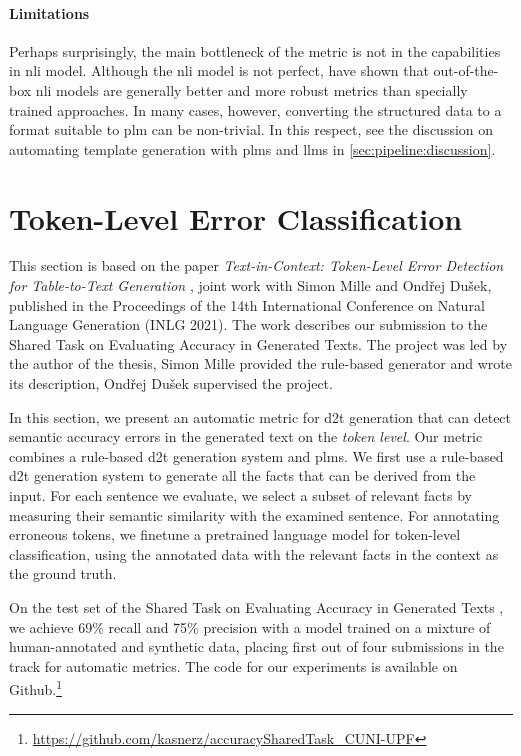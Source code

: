 \paragraph{Limitations} Perhaps surprisingly, the main bottleneck of the metric is not in the capabilities in \ac{nli} model. Although the \ac{nli} model is not perfect, \citet{chenMENLIRobustEvaluation2022} have shown that out-of-the-box \ac{nli} models are generally better and more robust metrics than specially trained approaches. In many cases, however, converting the structured data to a format suitable to \ac{plm} can be non-trivial. In this respect, see the discussion on automating template generation with \acp{plm} and \acp{llm} in \autoref{sec:pipeline:discussion}.


\section{Token-Level Error Classification}
\label{sec:tok-eval}

\begin{refbox}
    This section is based on the paper \emph{Text-in-Context: Token-Level Error Detection for Table-to-Text Generation} \cite{kasnerTextinContextTokenLevelError2021}, joint work with Simon Mille and Ondřej Dušek, published in the Proceedings of the 14th International Conference on Natural Language Generation (INLG 2021). The work describes our submission to the Shared Task on Evaluating Accuracy in Generated Texts. The project was led by the author of the thesis, Simon Mille provided the rule-based generator and wrote its description, Ondřej Dušek supervised the project.
\end{refbox}


In this section, we present an automatic metric for \ac{d2t} generation that can detect semantic accuracy errors in the generated text on the \emph{token level}. Our metric combines a rule-based \ac{d2t} generation system and \acp{plm}. We first use a rule-based \ac{d2t} generation system to generate all the facts that can be derived from the input. For each sentence we evaluate, we select a subset of relevant facts by measuring their semantic similarity with the examined sentence. For annotating erroneous tokens, we finetune a pretrained language model for token-level classification, using the annotated data with the relevant facts in the context as the ground truth.

On the test set of the Shared Task on Evaluating Accuracy in Generated Texts \cite{thomsonGenerationChallengesResults2021}, we achieve 69\% recall and 75\% precision with a model trained on a mixture of human-annotated and synthetic data, placing first out of four submissions in the track for automatic metrics. The code for our experiments is available on Github.\footnote{\url{https://github.com/kasnerz/accuracySharedTask_CUNI-UPF}}


